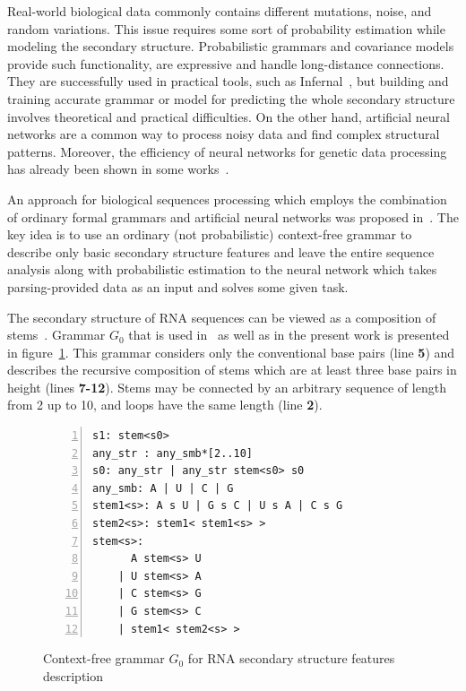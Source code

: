 \documentclass[runningheads]{llncs}
\begin{document}
Real-world biological data commonly contains different mutations, noise, and random variations.
This issue requires some sort of probability estimation while modeling the secondary structure.
Probabilistic grammars and covariance models provide such functionality, are expressive and handle long-distance connections.
They are successfully used in practical tools, such as Infernal~\cite{Infernal}, but building and training accurate grammar or model for predicting the whole secondary structure involves theoretical and practical difficulties.
On the other hand, artificial neural networks are a common way to process noisy data and find complex structural patterns.
Moreover, the efficiency of neural networks for genetic data processing has already been shown in some works~\cite{Humidor,ANN}.

An approach for biological sequences processing which employs the combination of ordinary formal grammars and artificial neural networks was proposed in~\cite{grigorevcomposition}.  
The key idea is to use an ordinary (not probabilistic)  context-free grammar to describe only basic secondary structure features and leave the entire sequence analysis along with probabilistic estimation to the neural network which takes parsing-provided data as an input and solves some given task.

The secondary structure of RNA sequences can be viewed as a composition of stems~\cite{MQbioinformatics19}.
Grammar $G_0$ that is used in~\cite{grigorevcomposition} as well as in the present work is presented in figure~\ref{gram}.
This grammar considers only the conventional base pairs (line \textbf{5}) and describes the recursive composition of stems which are at least three base pairs in height (lines \textbf{7-12}). Stems may be connected by an arbitrary sequence of length from 2 up to 10, and loops have the same length (line \textbf{2}).

\begin{figure}
\begin{Verbatim}[numbers=left,xleftmargin=5mm]
s1: stem<s0>
any_str : any_smb*[2..10]
s0: any_str | any_str stem<s0> s0
any_smb: A | U | C | G
stem1<s>: A s U | G s C | U s A | C s G 
stem2<s>: stem1< stem1<s> >
stem<s>:  
      A stem<s> U 
    | U stem<s> A 
    | C stem<s> G 
    | G stem<s> C 
    | stem1< stem2<s> >  
\end{Verbatim}
\caption{Context-free grammar $G_0$ for RNA secondary structure features description}
\label{gram}
\end{figure}
\end{document}

